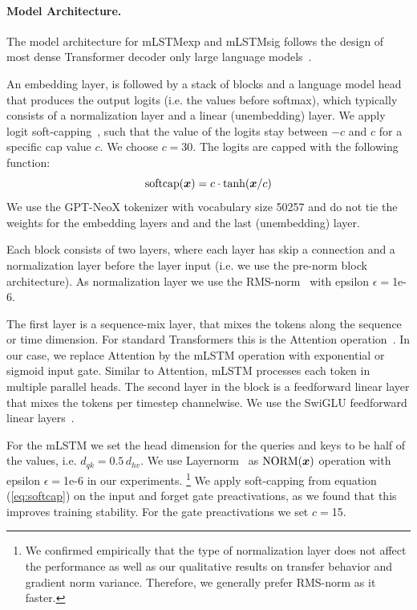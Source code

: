 \documentclass{article}
\begin{document}
    \paragraph{Model Architecture.}
    The model architecture for mLSTMexp and mLSTMsig
    follows
    the design of most dense Transformer decoder only large language models~\citep{radford:19gpt2, brown:20gpt3, touvron:23llama1, touvron:23llama2}.

    An embedding layer, is followed by a stack of blocks and a language model head that produces the output logits (i.e. the values before softmax), which typically consists of a normalization layer and a linear (unembedding) layer.
    We apply logit soft-capping~\citep{gemmateam:24gemma2}, such that the value of the logits stay between $-c$ and $c$ for a specific cap value $c$.
    We choose $c=$30.
    The logits are capped with the following function:
    \begin{equation}
        \label{eq:softcap}
        \mathrm{softcap}(\bm{x}) = c \cdot \tanh(\bm{x} / c)
    \end{equation}
    We use the GPT-NeoX tokenizer \citep{black:22GPTNeox} with vocabulary size 50257 and do not tie the weights for the embedding layers and and the last (unembedding) layer.

    Each block consists of two layers, where each layer has skip a connection and a normalization layer before the layer input (i.e. we use the pre-norm block architecture). As normalization layer we use the RMS-norm~\citep{zhang:19rmsnorm} with epsilon $\epsilon=$1e-6.

    The first layer is a sequence-mix layer, that mixes the tokens along the sequence or time dimension. For standard Transformers this is the Attention operation~\citep{vaswani:17attention}.
    In our case, we replace Attention by the mLSTM operation with exponential or sigmoid input gate.
    Similar to Attention, mLSTM processes each token in multiple parallel heads.
    The second layer in the block is a feedforward linear layer that mixes the tokens per timestep channelwise.
    We use the SwiGLU feedforward linear layers~\citep{shazeer:20swiglu, touvron:23llama1}.

    For the mLSTM we set the head dimension for the queries and keys to be half of the values, i.e. $d_{qk} = 0.5 \, d_{hv}$.
    We use Layernorm~\citep{ba:16layernorm} as $\mathrm{NORM}(\bm{x})$ operation with epsilon $\epsilon=$1e-6 in our experiments.
    \footnote{We confirmed empirically that the type of normalization layer does not affect the performance as well as our qualitative results on transfer behavior and gradient norm variance. Therefore, we generally prefer RMS-norm as it faster.}
    We apply soft-capping from equation (\ref{eq:softcap}) on the input and forget gate preactivations, as we found that this improves training stability.
    For the gate preactivations we set $c=$15.
\end{document}
